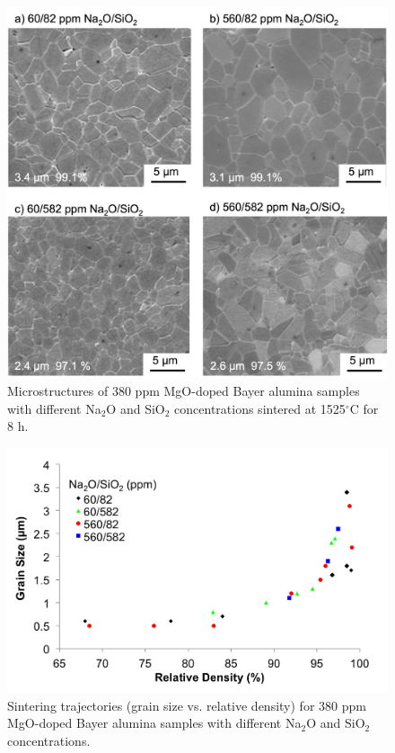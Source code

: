\newpage
\begin{figure}[H]
	\centering
	\includegraphics[width=\textwidth]{Chapter-3/Figures/Figure4.png}
	\caption{Microstructures of 380 ppm MgO-doped Bayer alumina samples with different Na$_{2}$O and SiO$_{2}$ concentrations sintered at 1525$^{\circ}$C for 8 h.}
	\label{Ch3-figure:Figure4}
\end{figure}

\newpage
\begin{figure}[H]
	\centering
	\includegraphics[width=\textwidth]{Chapter-3/Figures/Figure5.png}
	\caption{Sintering trajectories (grain size vs. relative density) for 380 ppm MgO-doped Bayer alumina samples with different Na$_{2}$O and SiO$_{2}$ concentrations.}
	\label{Ch3-figure:Figure5}
\end{figure}

